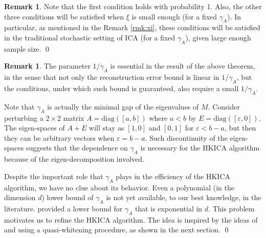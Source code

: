 \documentclass[twoside]{article}
\theoremstyle{definition}
\newtheorem{remark}[lemma]{Remark}
\newcommand{\eps}{\varepsilon}
\begin{document}
\begin{remark}
Note that the first condition holds with probability 1. Also, the other three conditions will be satisfied when $\xi$ is small enough (for a fixed $\gamma_A$).
In particular, as mentioned in the Remark \ref{rmk:xi}, these conditions will be satisfied in the traditional stochastic setting of ICA (for a fixed $\gamma_A$), given large enough sample size. \qed
\end{remark}
\begin{remark}
The parameter $1/\gamma_A$ is essential in the result of the above theorem, in the sense that not only the reconstruction error bound is linear in $1/\gamma_A$, but the conditions, under which such bound is guaranteed, also require a small $1/\gamma_A$.

Note that $\gamma_A$ is actually the minimal gap of the eigenvalues of $M$.
Consider perturbing a $2\times 2$ matrix $A = \text{diag}([a,b])$ where $a<b$ by $E = \text{diag}([\eps,0])$. 
The eigen-spaces of $A+E$ will stay as $[1,0]$ and $[0,1]$ for $\eps < b-a$, but then they can be arbitrary vectors when $\eps = b-a$.  
Such discontinuity of the eigen-spaces suggests that the dependence on $\gamma_A$ is necessary for the HKICA algorithm because of the eigen-decomposition involved. 

Despite the important role that $\gamma_A$ plays in the efficiency of the HKICA algorithm, we have no clue about its behavior. 
Even a polynomial (in the dimension $d$) lower bound of $\gamma_A$ is not yet available, to our best knowledge, in the literature. 
\citet{goyal2014fourier} provided a lower bound for $\gamma_A$ that is exponential in $d$.
This problem motivates us to refine the HKICA algorithm.
The idea is inspired by the ideas of \citet{arora2012provable} and \citet{frieze1996learning} using a quasi-whitening procedure, as shown in the next section. \qed
\end{remark}
\end{document}
